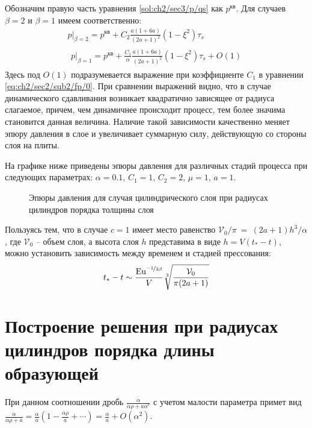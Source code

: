 Обозначим правую часть уравнения \cref{sol:ch2/sec3/p/qs} как $p^\text{кв}$. Для случаев $\beta=2$ и $\beta=1$ имеем соответственно:
\begin{gather}
  p\lvert_{\beta=2} = p^\text{кв} + C_2 \frac{a(1+6a)}{(2a+1)^2}\left(1-\xi^2\right) \tau_{s}
  \\
  \begin{multlined}
    p\lvert_{\beta=1} = p^\text{кв}+ \frac{C_1}{\alpha} \frac{a(1+6a)}{(2a+1)^2}\left(1-\xi^2\right)\tau_{s} + O(1)
  \end{multlined}
\end{gather}
Здесь под $O(1)$ подразумевается выражение при коэффициенте $C_1$ в уравнении \cref{eq:ch2/sec2/sub2/fp/0}.
При сравнении выражений видно, что в случае динамического сдавливания возникает квадратично зависящее от радиуса слагаемое, причем, чем динамичнее происходит процесс, тем более значима становится данная величина. Наличие такой зависимости качественно меняет эпюру давления в слое и увеличивает суммарную силу, действующую со стороны слоя на плиты.

На графике ниже приведены эпюры давления для различных стадий процесса при следующих параметрах: $\alpha=0.1$, $C_1=1$, $C_2=2$, $\mu=1$, $a=1$.
\begin{figure}[ht!]
  \caption{Эпюры давления для случая цилиндрического слоя при радиусах цилиндров порядка толщины слоя}
  \label{fig:ch2/sec3/pressure}
\end{figure}

Пользуясь тем, что в случае $c=1$ имеет место равенство $\mathcal{V}_0 / \pi~=~\left(2a + 1\right) h^{3} / \alpha$, где $\mathcal{V}_0$ -- объем слоя, а высота слоя $h$ представима в виде $h=V \left(t_*-t\right)$, можно установить зависимость между временем и стадией прессования:
\begin{equation}
  t_* - t \sim \frac{\text{Eu}^{\nicefrac{-1}{3\beta}}}{V}\sqrt[3]{\frac{\mathcal{V}_0}{\pi(2a+1)}}
\end{equation}

\section{Построение решения при радиусах цилиндров порядка длины образующей}\label{sec:ch2/sec4}

При данном соотношении дробь $\frac{\alpha}{\alpha\rho+a \alpha^c}$ с учетом малости параметра примет вид $\frac{\alpha}{\alpha\rho+a} = \frac{\alpha}{a}\left(1-\frac{\alpha\rho}{a}+\cdots\right) = \frac{\alpha}{a} + O\left(\alpha^2\right)$.

